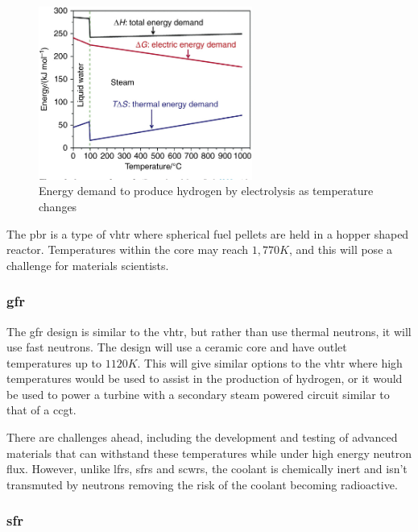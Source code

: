 \begin{figure}[tbp]
  \begin{center}
    \includegraphics[width=7.0cm]{chapters/introduction/images/hydrogen-from-water.png}
    \caption{Energy demand to produce hydrogen by electrolysis as temperature changes}
    \label{fig:energyhydrogenproduction}
  \end{center}
\end{figure}

The \acrfull{pbr} is a type of \acrshort{vhtr} where spherical fuel pellets are held in a hopper shaped reactor.  Temperatures within the core may reach $1,770K$, and this will pose a challenge for materials scientists.

\FloatBarrier
\subsubsection{\acrshort{gfr}}

The \acrfull{gfr} design is similar to the \acrshort{vhtr}, but rather than use thermal neutrons, it will use fast neutrons.  The design will use a ceramic core and have outlet temperatures up to $1120K$.  This will give similar options to the \acrshort{vhtr} where high temperatures would be used to assist in the production of hydrogen, or it would be used to power a turbine with a secondary steam powered circuit similar to that of a \acrshort{ccgt}.

There are challenges ahead, including the development and testing of advanced materials that can withstand these temperatures while under high energy neutron flux.  However, unlike \acrshort{lfr}s, \acrshort{sfr}s and \acrshort{scwr}s, the coolant is chemically inert and isn't transmuted by neutrons removing the risk of the coolant becoming radioactive.


\FloatBarrier
\subsubsection{\acrshort{sfr}}

